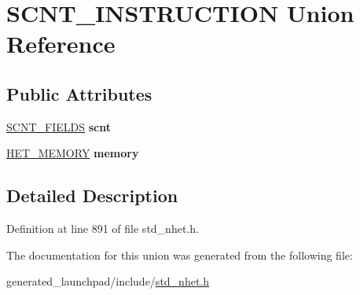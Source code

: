 \hypertarget{unionSCNT__INSTRUCTION}{}\section{S\+C\+N\+T\+\_\+\+I\+N\+S\+T\+R\+U\+C\+T\+I\+ON Union Reference}
\label{unionSCNT__INSTRUCTION}
\subsection*{Public Attributes}
\begin{DoxyCompactItemize}
\item 
\mbox{\label{unionSCNT__INSTRUCTION_abb7e0649ec12b9795d2a590ee1a9bb81}} 
\mbox{\hyperlink{structscnt__format}{S\+C\+N\+T\+\_\+\+F\+I\+E\+L\+DS}} {\bfseries scnt}
\item 
\mbox{\label{unionSCNT__INSTRUCTION_a752f66ef5f7adde37dd64ec2bdcd8ecc}} 
\mbox{\hyperlink{structmemory__format}{H\+E\+T\+\_\+\+M\+E\+M\+O\+RY}} {\bfseries memory}
\end{DoxyCompactItemize}


\subsection{Detailed Description}


Definition at line 891 of file std\+\_\+nhet.\+h.



The documentation for this union was generated from the following file\+:\begin{DoxyCompactItemize}
\item 
generated\+\_\+launchpad/include/\mbox{\hyperlink{std__nhet_8h}{std\+\_\+nhet.\+h}}\end{DoxyCompactItemize}
